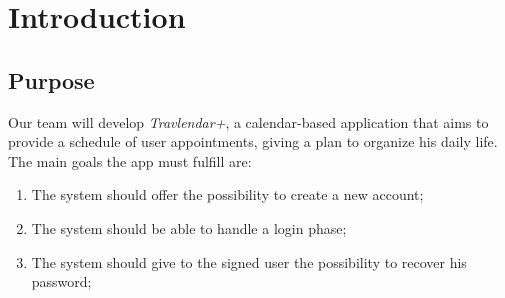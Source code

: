 \chapter{Introduction}

\section{Purpose}

Our team will develop \textit{Travlendar+}, a calendar-based application that aims to provide a schedule of user appointments, giving a plan to organize his daily life.
The main goals the app must fulfill are:

\begin{enumerate}
\renewcommand\labelenumi{\textbf{G\theenumi}}

\item The system should offer the possibility to create a new account;
\label{goal:G1}

\item The system should be able to handle a login phase;
\label{goal:G2}

\item The system should give to the signed user the possibility to recover his password;
\label{G3}


\end{enumerate}
